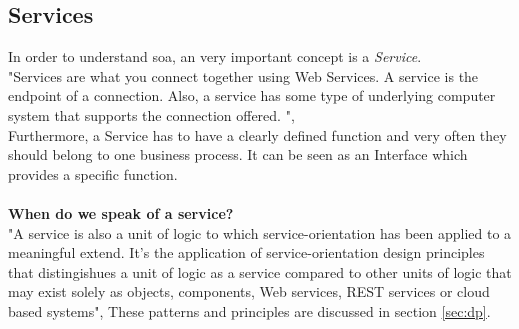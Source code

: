 \documentclass[12pt]{article}
\begin{document}
\subsection{Services}
In order to understand \gls{soa}, an very important concept is a \textit{Service}. \\
"Services are what you connect together using Web Services. A service is the endpoint of a connection. Also, a service has some type of underlying computer system that supports the connection offered. ",\cite{service1} \\ Furthermore, a Service has to have a clearly defined function and very often they should belong to one business process. It can be seen as an Interface which provides a specific function.\\ \\
\textbf{When do we speak of a service?}\\
"A service is also a unit of logic to which service-orientation has been applied to a meaningful extend. It's the application of service-orientation design principles that distingishues a unit of logic as a service compared to other units of logic that may exist solely as objects, components, Web services, REST services or cloud based systems",\cite[page 29]{grau} These patterns and principles are discussed in section \ref{sec:dp}. 
\end{document}
